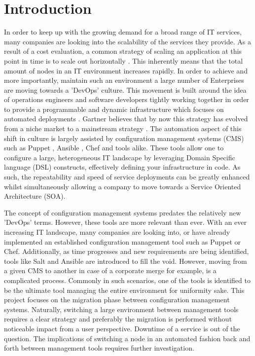 \section{Introduction}\label{sec:introduction}
In order to keep up with the growing demand for a broad range of IT services, many companies are looking into the scalability of the services they provide. As a result of a cost evaluation, a common strategy of scaling an application at this point in time is to scale out horizontally \cite{jaapvginkel}. This inherently means that the total amount of nodes in an IT environment increases rapidly. In order to achieve and more importantly, maintain such an environment a large number of Enterprises are moving towards a 'DevOps' culture. This movement is built around the idea of operations engineers and software developers tightly working together in order to provide a programmable and dynamic infrastructure which focuses on automated deployments \cite{loukides_2012}. Gartner believes that by now this strategy has evolved from a niche market to a mainstream strategy \cite{gartner_2015}. The automation aspect of this shift in culture is largely assisted by configuration management systems (CMS) such as Puppet \cite{whatispuppet}, Ansible \cite{whatisansible}, Chef \cite{whatischef} and tools alike. These tools allow one to configure a large, heterogeneous IT landscape by leveraging Domain Specific language (DSL) constructs, effectively defining your infrastructure in code. As such, the repeatability and speed of service deployments can be greatly enhanced whilst simultaneously allowing a company to move towards a Service Oriented Architecture (SOA).



The concept of configuration management systems predates the relatively new 'DevOps' terms. However, these tools are more relevant than ever. With an ever increasing IT landscape, many companies are looking into, or have already implemented an established configuration management tool such as Puppet or Chef. Additionally, as time progresses and new requirements are being identified, tools like Salt and Ansible are introduced to fill the void. However, moving from a given CMS to another in case of a corporate merge for example, is a complicated process. Commonly in such scenarios, one of the tools is identified to be the ultimate tool managing the entire environment for uniformity sake. This project focuses on the migration phase between configuration management systems. Naturally, switching a large environment between management tools requires a clear strategy and preferably the migration is performed without noticeable impact from a user perspective. Downtime of a service is out of the question. The implications of switching a node in an automated fashion back and forth between management tools requires further investigation. 

